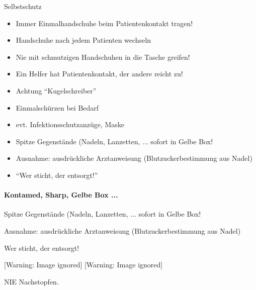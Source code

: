 \documentclass{article}
\makeatletter
\newcommand\captionof[1]{\def\@captype{#1}\caption}
\makeatother
\begin{document}
Selbstschutz

\begin{itemize}
\item Immer Einmalhandschuhe beim Patientenkontakt tragen!

\item Handschuhe nach jedem Patienten wechseln

\item Nie mit schmutzigen Handschuhen in die Tasche greifen!

\item Ein Helfer hat Patientenkontakt, der andere reicht zu!

\item Achtung {\textquotedblleft}Kugelschreiber{\textquotedblright}

\item Einmalsch\"urzen bei Bedarf

\end{itemize}
\begin{itemize}
\item evt. Infektionsschutzanz\"uge, Maske

\end{itemize}
\begin{itemize}
\item Spitze Gegenst\"ande (Nadeln, Lanzetten, ... sofort in Gelbe Box!

\end{itemize}
\begin{itemize}
\item Ausnahme: ausdr\"uckliche Arztanweisung (Blutzuckerbestimmung aus
Nadel)

\item {\textquotedblleft}Wer sticht, der entsorgt!{\textquotedblright}

\end{itemize}
\paragraph{Kontamed, Sharp, Gelbe Box ...}
Spitze Gegenst\"ande (Nadeln, Lanzetten, ... sofort in Gelbe Box!

Ausnahme: ausdr\"uckliche Arztanweisung (Blutzuckerbestimmung aus Nadel)

Wer sticht, der entsorgt!



\begin{center}
 [Warning: Image ignored] %
 [Warning: Image ignored] %
\captionof{figure}[Kontamed-Boxen, verschiedene
Fabrikate.]{Kontamed-Boxen, verschiedene Fabrikate.}

\end{center}
NIE Nachstopfen.
\end{document}
